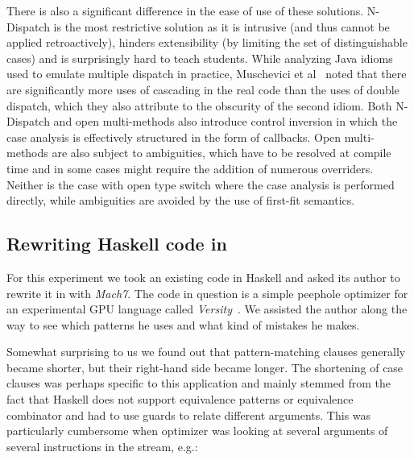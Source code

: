 There is also a significant difference in the ease of use of these solutions. 
N-Dispatch is the most restrictive solution as it is intrusive (and thus cannot 
be applied retroactively), hinders extensibility (by limiting the set of 
distinguishable cases) and is surprisingly hard to teach students. While 
analyzing Java idioms used to emulate multiple dispatch in practice, Muschevici 
et al~\cite[Figure 13]{MPTN08} noted that there are significantly more uses of 
cascading  in the real code than the uses of double dispatch, 
which they also attribute to the obscurity of the second idiom. Both N-Dispatch 
and open multi-methods also introduce control inversion in which the case 
analysis is effectively structured in the form of callbacks. Open multi-methods 
are also subject to ambiguities, which have to be resolved at compile time and 
in some cases might require the addition of numerous overriders. Neither is the 
case with open type switch where the case analysis is performed directly, while 
ambiguities are avoided by the use of first-fit semantics.



\subsection{Rewriting Haskell code in \Cpp{}}
\label{sec:qualcmp}

For this experiment we took an existing code in Haskell and asked its author to 
rewrite it in \Cpp{} with \emph{Mach7}. The code in question is a simple 
peephole optimizer for an experimental GPU language called 
\emph{Versity}~\cite{Versity}. We assisted the author along the way to see which 
patterns he uses and what kind of mistakes he makes.

Somewhat surprising to us we found out that pattern-matching clauses generally 
became shorter, but their right-hand side became longer. The shortening of case 
clauses was perhaps specific to this application and mainly stemmed from the 
fact that Haskell does not support equivalence patterns or equivalence 
combinator and had to use guards to relate different arguments. This was 
particularly cumbersome when optimizer was looking at several arguments of 
several instructions in the stream, e.g.:

